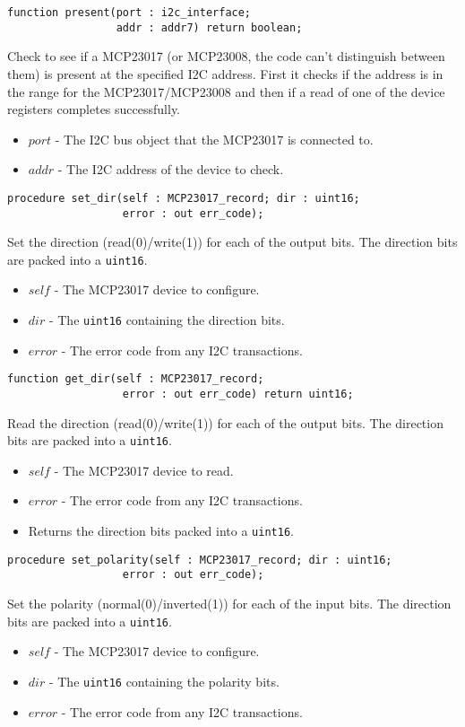 \documentclass[10pt, openany]{book}
\newcommand{\indexfunc}[1]{\index[func]{#1}}
\newcommand{\datatype}[1]{\texttt{#1}}
\begin{document}
\begin{lstlisting}
function present(port : i2c_interface;
                 addr : addr7) return boolean;
\end{lstlisting}
\indexfunc{present}
Check to see if a MCP23017 (or MCP23008, the code can't distinguish between them) is present at the specified I2C address.  First it checks if the address is in the range for the MCP23017/MCP23008 and then if a read of one of the device registers completes successfully.
\begin{itemize}
  \item $port$ - The I2C bus object that the MCP23017 is connected to.
  \item $addr$ - The I2C address of the device to check.
\end{itemize}

\begin{lstlisting}
procedure set_dir(self : MCP23017_record; dir : uint16;
                  error : out err_code);
\end{lstlisting}
\indexfunc{set\_dir}
Set the direction (read(0)/write(1)) for each of the output bits.  The direction bits are packed into a \datatype{uint16}.
\begin{itemize}
  \item $self$ - The MCP23017 device to configure.
  \item $dir$ - The \datatype{uint16} containing the direction bits.
  \item $error$ - The error code from any I2C transactions.
\end{itemize}

\begin{lstlisting}
function get_dir(self : MCP23017_record;
                  error : out err_code) return uint16;
\end{lstlisting}
\indexfunc{get\_dir}
Read the direction (read(0)/write(1)) for each of the output bits.  The direction bits are packed into a \datatype{uint16}.
\begin{itemize}
  \item $self$ - The MCP23017 device to read.
  \item $error$ - The error code from any I2C transactions.
  \item Returns the direction bits packed into a \datatype{uint16}.
\end{itemize}

\begin{lstlisting}
procedure set_polarity(self : MCP23017_record; dir : uint16;
                  error : out err_code);
\end{lstlisting}
\indexfunc{set\_polarity}
Set the polarity (normal(0)/inverted(1)) for each of the input bits.  The direction bits are packed into a \datatype{uint16}.
\begin{itemize}
  \item $self$ - The MCP23017 device to configure.
  \item $dir$ - The \datatype{uint16} containing the polarity bits.
  \item $error$ - The error code from any I2C transactions.
\end{itemize}
\end{document}
